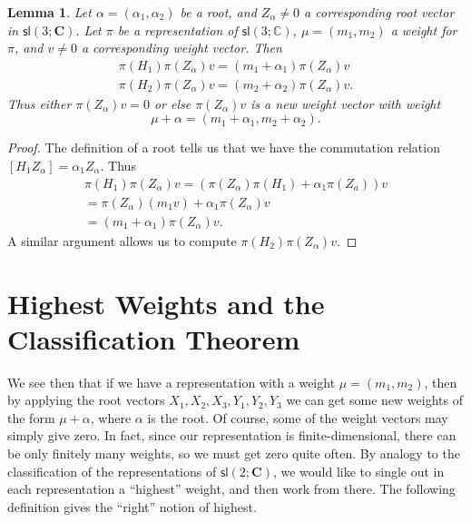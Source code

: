 \documentclass[12pt]{amsbook}
\theoremstyle{plain}
\newtheorem{lemma}[theorem]{Lemma}
\numberwithin{equation}{chapter}
\numberwithin{theorem}{chapter}
\begin{document}
\begin{lemma}
\label{weight.root}Let $\alpha=(\alpha_{1},\alpha_{2})$ be a root, and
$Z_{\alpha}\neq0$ a corresponding root vector in $\mathsf{sl}\left(
3;\mathbf{C}\right)  $. Let $\pi$ be a representation of $\mathsf{sl}\left(
3;\mathbb{C}\right)  $, $\mu=(m_{1},m_{2})$ a weight for $\pi$, and $v\neq0$ a
corresponding weight vector. Then
\begin{align*}
\pi(H_{1})\pi(Z_{\alpha})v=(m_{1}+\alpha_{1})\pi(Z_{\alpha})v\\
\pi(H_{2})\pi(Z_{\alpha})v=(m_{2}+\alpha_{2})\pi(Z_{\alpha})v\text{.}%
\end{align*}
Thus either $\pi(Z_{\alpha})v=0$ or else $\pi(Z_{\alpha})v$ is a new weight
vector with weight
\[
\mu+\alpha=(m_{1}+\alpha_{1},m_{2}+\alpha_{2})\text{.}%
\]
\end{lemma}

\begin{proof}
The definition of a root tells us that we have the commutation relation
$\left[  H_{1}Z_{\alpha}\right]  =\alpha_{1}Z_{\alpha}$. Thus
\begin{align*}
\pi(H_{1})\pi(Z_{\alpha})v=\left(  \pi(Z_{\alpha})\pi(H_{1})+\alpha_{1}%
\pi(Z_{a})\right)  v\\
=\pi(Z_{\alpha})(m_{1}v)+\alpha_{1}\pi(Z_{\alpha})v\\
=(m_{1}+\alpha_{1})\pi(Z_{\alpha})v\text{.}%
\end{align*}
A similar argument allows us to compute $\pi(H_{2})\pi(Z_{\alpha})v$.
\end{proof}

\section{Highest Weights and the Classification Theorem}

We see then that if we have a representation with a weight $\mu=(m_{1},m_{2}%
)$, then by applying the root vectors $X_{1},X_{2},X_{3},Y_{1},Y_{2},Y_{3}$ we
can get some new weights of the form $\mu+\alpha$, where $\alpha$ is the root.
Of course, some of the weight vectors may simply give zero. In fact, since our
representation is finite-dimensional, there can be only finitely many weights,
so we must get zero quite often. By analogy to the classification of the
representations of $\mathsf{sl}(2;\mathbf{C})$, we would like to single out in
each representation a ``highest'' weight, and then work from there. The
following definition gives the ``right'' notion of highest.
\end{document}
